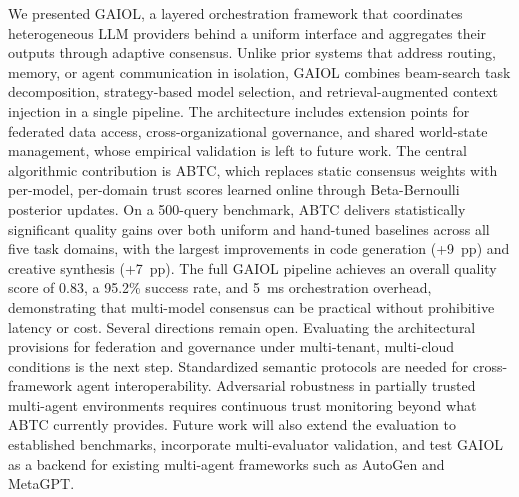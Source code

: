\documentclass{iopjournal}
\begin{document}
We presented GAIOL, a layered orchestration framework that coordinates heterogeneous LLM providers behind a uniform interface and aggregates their outputs through adaptive consensus. Unlike prior systems that address routing, memory, or agent communication in isolation, GAIOL combines beam-search task decomposition, strategy-based model selection, and retrieval-augmented context injection in a single pipeline. The architecture includes extension points for federated data access, cross-organizational governance, and shared world-state management, whose empirical validation is left to future work. The central algorithmic contribution is ABTC, which replaces static consensus weights with per-model, per-domain trust scores learned online through Beta-Bernoulli posterior updates. On a 500-query benchmark, ABTC delivers statistically significant quality gains over both uniform and hand-tuned baselines across all five task domains, with the largest improvements in code generation (+9~pp) and creative synthesis (+7~pp). The full GAIOL pipeline achieves an overall quality score of 0.83, a 95.2\% success rate, and 5~ms orchestration overhead, demonstrating that multi-model consensus can be practical without prohibitive latency or cost. Several directions remain open. Evaluating the architectural provisions for federation and governance under multi-tenant, multi-cloud conditions is the next step. Standardized semantic protocols are needed for cross-framework agent interoperability. Adversarial robustness in partially trusted multi-agent environments requires continuous trust monitoring beyond what ABTC currently provides. Future work will also extend the evaluation to established benchmarks, incorporate multi-evaluator validation, and test GAIOL as a backend for existing multi-agent frameworks such as AutoGen and MetaGPT.




\\
\end{document}
